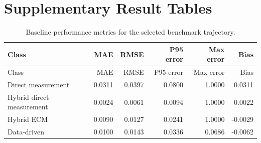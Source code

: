 \documentclass[review,nopreprintline]{elsarticle}
\begin{document}
\appendix
\section{Supplementary Result Tables}

\begin{longtable}{lrrrrr}
\caption{Baseline performance metrics for the selected benchmark trajectory.}\label{tab:appendix_baseline_metrics}\\
\toprule
Class & MAE & RMSE & P95 error & Max error & Bias \\
\midrule
\endfirsthead
\toprule
Class & MAE & RMSE & P95 error & Max error & Bias \\
\midrule
\endhead
Direct measurement & 0.0311 & 0.0397 & 0.0800 & 1.0000 & 0.0311 \\
Hybrid direct measurement & 0.0024 & 0.0061 & 0.0094 & 1.0000 & 0.0022 \\
Hybrid ECM & 0.0090 & 0.0127 & 0.0241 & 1.0000 & -0.0029 \\
Data-driven & 0.0100 & 0.0143 & 0.0336 & 0.0686 & -0.0062 \\
\bottomrule
\end{longtable}
\end{document}

